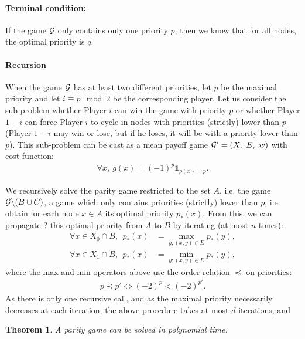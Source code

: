 \documentclass{article}
\newtheorem{theorem}{Theorem}
\def\1{{\mathds 1}}
\def\G{{\cal G}}
\begin{document}
\paragraph{Terminal condition:} If the game $\G$ only contains only one priority $p$, then we know that for all nodes, the optimal priority is $q$.
\paragraph{Recursion} When the game $\G$ has at least two different priorities, let $p$ be the maximal priority and let $i \equiv p \mod 2$ be the corresponding player. 
Let us consider the sub-problem whether Player $i$ can win the game with priority $p$ or whether Player $1-i$ can force Player $i$ to cycle in nodes with priorities (strictly) lower than $p$ (Player $1-i$ may win or lose, but if he loses, it will be with a priority lower than $p$). This sub-problem can be cast as a mean payoff game $\G'=(X,~ E,~ w)$ with cost function:
\begin{align}
  \forall x,~ g(x) = (-1)^p \1_{p(x)=p}.
\end{align}


We recursively solve the parity game restricted to the set $A$, i.e. the game $\G \backslash (B \cup C)$, a game which only contains priorities (strictly) lower than $p$, i.e. obtain for each node $x \in A$ its optimal priority $p_*(x)$. From this, we can propagate ? this optimal priority from $A$ to $B$ by iterating (at most $n$ times):
\begin{align}
  \forall x \in X_0 \cap B, ~~ p_*(x) &= \max_{y;(x,y)\in E} p_*(y), \\
  \forall x \in X_1 \cap B, ~~ p_*(x) &= \min_{y;(x,y)\in E} p_*(y),
\end{align}
where the max and min operators above use the order relation $\preceq$ on priorities:
\begin{align}
  p \prec p' \Leftrightarrow (-2)^{p}<(-2)^{p'}.  
\end{align}
As there is only one recursive call, and as the maximal priority necessarily decreases at each iteration, the above procedure takes at most $d$ iterations, and
\begin{theorem}
A parity game can be solved in polynomial time.
\end{theorem}



 
\end{document}
